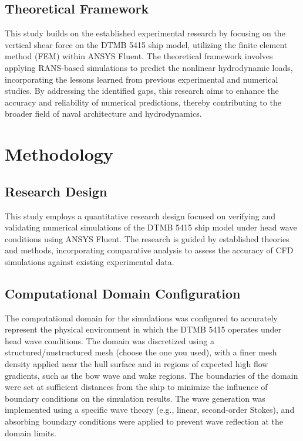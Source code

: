 \documentclass[12pt]{article} %
\begin{document}
\subsection{Theoretical Framework}
This study builds on the established experimental research by focusing on the vertical shear force on 
the DTMB 5415 ship model, utilizing the finite element method (FEM) within ANSYS Fluent. The theoretical 
framework involves applying RANS-based simulations to predict the nonlinear hydrodynamic loads, 
incorporating the lessons learned from previous experimental and numerical studies. By addressing the 
identified gaps, this research aims to enhance the accuracy and reliability of numerical predictions, 
thereby contributing to the broader field of naval architecture and hydrodynamics.


\newpage
\section{Methodology}

\subsection{Research Design}
This study employs a quantitative research design focused on verifying and validating numerical 
simulations of the DTMB 5415 ship model under head wave conditions using ANSYS Fluent. The research 
is guided by established theories and methods, incorporating comparative analysis to assess the 
accuracy of CFD simulations against existing experimental data.

\subsection{Computational Domain Configuration}
The computational domain for the simulations was configured to accurately represent the physical 
environment in which the DTMB 5415 operates under head wave conditions. The domain was discretized 
using a structured/unstructured mesh (choose the one you used), with a finer mesh density applied 
near the hull surface and in regions of expected high flow gradients, such as the bow wave and wake 
regions. The boundaries of the domain were set at sufficient distances from the ship to minimize the 
influence of boundary conditions on the simulation results. The wave generation was implemented using 
a specific wave theory (e.g., linear, second-order Stokes), and absorbing boundary conditions were 
applied to prevent wave reflection at the domain limits.
\end{document}
